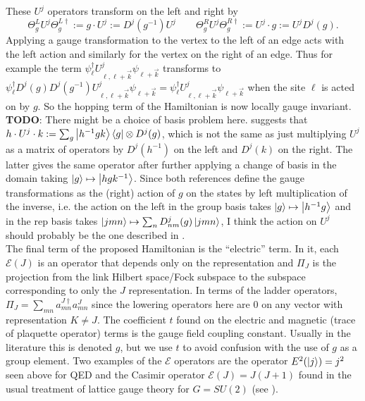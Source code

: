 \documentclass[11pt,reqno]{amsart}
\numberwithin{equation}{section}
\begin{document}
	These $U^j$ operators transform on the left and right by 
	\begin{equation}
		\Theta_{g}^L U^j \Theta_g^{L\dagger} :=g\cdot U^j := D^j(g^{-1})U^j \qquad \Theta_{g}^R U^j \Theta_g^{R\dagger} := U^j \cdot g := U^j D^j(g).
	\end{equation}
	Applying a gauge transformation to the vertex to the left of an edge acts with the left action and similarly for the vertex on the right of an edge.
	Thus for example the term $\psi_\ell^\dagger U_{\ell,\ell+\vec{k}}^j\psi_{\ell+\vec{k}}$ transforms to $\psi_\ell^\dagger D^j(g) D^j(g^{-1})U_{\ell,\ell+\vec{k}}^j\psi_{\ell+\vec{k}} = \psi_\ell^\dagger U_{\ell,\ell+\vec{k}}^j\psi_{\ell+\vec{k}}$ when the site $\ell$ is acted on by $g$.
	So the hopping term of the Hamiltonian is now locally gauge invariant. \\
	
	\textbf{TODO}: There might be a choice of basis problem here. 
	\cite{TCL14} suggests that $h\cdot U^j \cdot k := \sum_{g} \ket{h^{-1}gk}\bra{g} \otimes D^j(g)$, which is not the same as just multiplying $U^j$ as a matrix of operators by $D^j(h^{-1})$ on the left and $D^j(k)$ on the right. 
	The latter gives the same operator after further applying a change of basis in the domain taking $\ket{g} \mapsto \ket{hgk^{-1}}$. 
	Since both references define the gauge transformations as the (right) action of $g$ on the states by left multiplication of the inverse, i.e. the action on the left in the group basis takes $\ket{g} \mapsto \ket{h^{-1}g}$ and in the rep basis takes $\ket{jmn}\mapsto \sum_{n}D^j_{nm}(g)\ket{jmn}$, I think the action on $U^j$ should probably be the one described in \cite{TCL14}.\\
	
	
	The final term of the proposed Hamiltonian is the ``electric'' term. 
	In it, each $\mathcal{E}(J)$ is an operator that depends only on the representation and $\Pi_J$ is the projection from the link Hilbert space/Fock subspace to the subspace corresponding to only the $J$ representation. 
	In terms of the ladder operators, $\Pi_J=\sum_{mn} a^{J\dagger}_{mn}a^J_{mn}$ since the lowering operators here are 0 on any vector with representation $K\neq J$.
	The coefficient $t$ found on the electric and magnetic (trace of plaquette operator) terms is the gauge field coupling constant. 
	Usually in the literature this is denoted $g$, but we use $t$ to avoid confusion with the use of $g$ as a group element.
	Two examples of the $\mathcal{E}$ operators are the operator $E^2(\ket{j})=j^2$ seen above for QED and the Casimir operator $\mathcal{E}(J)=J(J+1)$ found in the usual treatment of lattice gauge theory for $G=SU(2)$ (see \cite{KogutSusskind75}).
	
\end{document}

